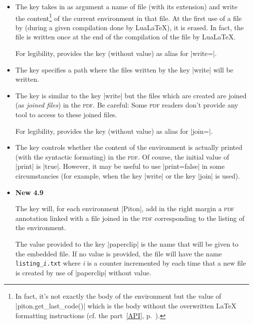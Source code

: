 \documentclass{article}
\begin{document}
\bigskip
\begin{itemize}
\item {} The key  takes in as argument a name of
file (with its extension) and write the content\footnote{In fact, it's not
exactly the body of the environment but the value of |piton.get_last_code()|
which is the body without the overwritten LaTeX formatting instructions (cf.
the part~\ref{API}, p.~\pageref{API}).} of the current environment in
that file. At the first use of a file by  (during a given
compilation done by LuaLaTeX), it is erased. In fact, the file is written once at
the end of the compilation of the file by LuaLaTeX.

For legibility,  provides the key  (without value)
as alias for |write={}|.

\item {} The key  specifies a path
where the files written by the key |write| will be written.

\item The key  is similar to the key |write| but the files which
are created are joined (as \emph{joined files}) in the \textsc{pdf}. Be
careful: Some \textsc{pdf} readers don't provide any tool to access to these
joined files.

For legibility,  provides the key  (without value)
as alias for |join={}|.

\item {}
The key  controls whether the content of the environment is 
actually printed (with the syntactic formating) in the \textsc{pdf}. Of
course, the initial value of |print| is |true|. However, it may be useful to
use |print=false| in some circumstancies (for example, when the key |write| or
the key |join| is used).

\item \colorbox{yellow!50}{\textbf{New 4.9}}

\nobreak
The key  will, for each environment |{Piton}|, add in the right
margin a \textsc{pdf} annotation linked with a file joined in the \textsc{pdf}
corresponding to the listing of the environment.

The value provided to the key |paperclip| is the name that will be given to the embedded
file. If no value is provided, the file will have the name \texttt{listing_\textsl{i}.txt}
where \textsl{i} is a counter incremented by  each time that a new file is
created by use of |paperclip| without value.


\end{itemize}
\end{document}
